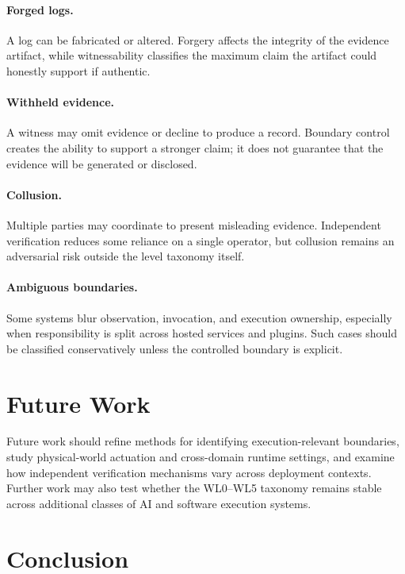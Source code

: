 \documentclass[11pt]{article}
\begin{document}
\paragraph{Forged logs.} A log can be fabricated or altered. Forgery affects the integrity of the evidence artifact, while witnessability classifies the maximum claim the artifact could honestly support if authentic.

\paragraph{Withheld evidence.} A witness may omit evidence or decline to produce a record. Boundary control creates the ability to support a stronger claim; it does not guarantee that the evidence will be generated or disclosed.

\paragraph{Collusion.} Multiple parties may coordinate to present misleading evidence. Independent verification reduces some reliance on a single operator, but collusion remains an adversarial risk outside the level taxonomy itself.

\paragraph{Ambiguous boundaries.} Some systems blur observation, invocation, and execution ownership, especially when responsibility is split across hosted services and plugins. Such cases should be classified conservatively unless the controlled boundary is explicit.

\section{Future Work}

Future work should refine methods for identifying execution-relevant boundaries, study physical-world actuation and cross-domain runtime settings, and examine how independent verification mechanisms vary across deployment contexts. Further work may also test whether the WL0--WL5 taxonomy remains stable across additional classes of AI and software execution systems.

\section{Conclusion}
\end{document}
